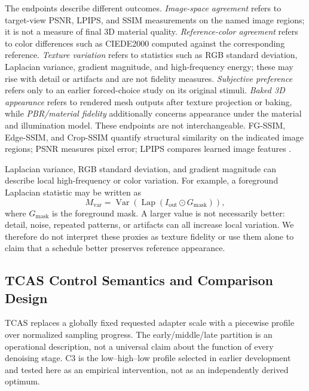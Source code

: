 \documentclass[times,twocolumn,final]{elsarticle}
\begin{document}
The endpoints describe different outcomes. \emph{Image-space agreement} refers to target-view PSNR, LPIPS, and SSIM measurements on the named image regions; it is not a measure of final 3D material quality. \emph{Reference-color agreement} refers to color differences such as CIEDE2000 computed against the corresponding reference. \emph{Texture variation} refers to statistics such as RGB standard deviation, Laplacian variance, gradient magnitude, and high-frequency energy; these may rise with detail or artifacts and are not fidelity measures. \emph{Subjective preference} refers only to an earlier forced-choice study on its original stimuli. \emph{Baked 3D appearance} refers to rendered mesh outputs after texture projection or baking, while \emph{PBR/material fidelity} additionally concerns appearance under the material and illumination model. These endpoints are not interchangeable. FG-SSIM, Edge-SSIM, and Crop-SSIM quantify structural similarity on the indicated image regions; PSNR measures pixel error; LPIPS compares learned image features \cite{wang2004ssim,zhang2018lpips}.

Laplacian variance, RGB standard deviation, and gradient magnitude can describe local high-frequency or color variation. For example, a foreground Laplacian statistic may be written as
\begin{equation}
M_{\mathrm{var}}=\operatorname{Var}\!\left(\operatorname{Lap}(I_{\mathrm{out}}\odot G_{\mathrm{mask}})\right),
\end{equation}
where $G_{\mathrm{mask}}$ is the foreground mask. A larger value is not necessarily better: detail, noise, repeated patterns, or artifacts can all increase local variation. We therefore do not interpret these proxies as texture fidelity or use them alone to claim that a schedule better preserves reference appearance.

\subsection{TCAS Control Semantics and Comparison Design}
\label{subsec:tcas}

TCAS replaces a globally fixed requested adapter scale with a piecewise profile over normalized sampling progress. The early/middle/late partition is an operational description, not a universal claim about the function of every denoising stage. C3 is the low--high--low profile selected in earlier development and tested here as an empirical intervention, not as an independently derived optimum.
\end{document}
